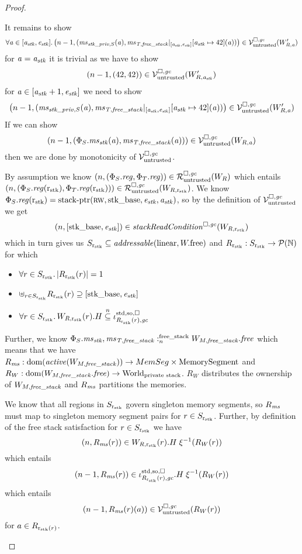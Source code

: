 \begin{proof}
\begin{itemize}
    It remains to show
    \[
      \forall \aaddr \in [\aaddr_\stk,\eaddr_\stk] \ldotp \npair[n-1]{(\ms_{\stk\_\priv,S}(\aaddr),\ms_\var{T,free\_stack}|_{[\aaddr_\stk,\eaddr_\stk]}\update{\aaddr_\stk}{42}(\aaddr))} \in \lrv(W_{R,\aaddr}')
    \]
    for $\aaddr = \aaddr_\stk$ it is trivial as we have to show
    \[
      \npair[n-1]{(42,42)} \in \lrv(W_{R,\aaddr_\stk}')
    \]
    for $\aaddr \in [\aaddr_\stk+1,\eaddr_\stk]$ we need to show
    \[
      \npair[n-1]{(\ms_{\stk\_\priv,S}(\aaddr),\ms_\var{T,free\_stack}|_{[\aaddr_\stk,\eaddr_\stk]}\update{\aaddr_\stk}{42}(\aaddr))} \in \lrv(W_{R,\aaddr}')
    \]
    If we can show
    \[
      \npair[n-1]{(\Phi_S.\ms_\stk(\aaddr),\ms_\var{T,free\_stack}(\aaddr))} \in \lrv(W_{R,\aaddr})
    \]
    then we are done by monotonicity of $\lrv$.

    By assumption we know $\npair{(\Phi_S.\reg,\Phi_T.\reg)} \in \lrr(W_R)$ which entails $\npair{(\Phi_S.\reg(\rstk),\Phi_T.\reg(\rstk))} \in \lrr(W_{R,\rstk})$.
    We know $\Phi_S.\reg(\rstk) = \stkptr{\rw,\stkb,\eaddr_\stk,\aaddr_\stk}$, so by the definition of $\lrv$ we get
    \[
      \npair{[\stkb,\eaddr_\stk]} \in \stackReadCond{W_{R,\rstk}}
    \]
    which in turn gives us $S_{\rstk} \subseteq \addressable{\linear,\pwfree}$ and
    $R_{\rstk} : S_{\rstk} \fun \powerset{\nats}$ for which
    \begin{itemize}
    \item $\forall r \in S_{\rstk} \ldotp |R_{\rstk}(r)| = 1$
    \item $\uplus_{r \in S_{\rstk}} R_{\rstk}(r) \supseteq [\stkb,\eaddr_\stk]$
    \item $\forall r \in S_{\rstk} \ldotp W_{R,\rstk}(r).H \nsubeq \stdreg{R_{\rstk}(r),\gc}{\spao}$
    \end{itemize}
    Further, we know $\memSatFStack{\Phi_S.\ms_\stk,\ms_\var{T,free\_stack}}{W_{M,\var{free\_stack}}.\free}$ which means that we have $R_\ms : \dom(\activeReg{W_{M,\var{free\_stack}}}) \fun MemSeg \times \MemSeg$ and $R_W : \dom(W_{M,\var{free\_stack}}.\free) \fun \Worlds$.
    $R_W$ distributes the ownership of $W_{M,\var{free\_stack}}$ and $R_\ms$ partitions the memories.

    We know that all regions in $S_{\rstk}$ govern singleton memory segments, so $R_\ms$ must map to singleton memory segment pairs for $r \in S_{\rstk}$.
    Further, by definition of the free stack satisfaction for $r \in S_{\rstk}$ we have
    \[
      \npair{R_\ms(r)} \in W_{R,\rstk}(r).H \; \xi^{-1}(R_W(r))
    \]
    which entails
    \[
      \npair[n-1]{R_\ms(r)} \in \stdreg{R_{\rstk}(r),\gc}{\spao}.H \; \xi^{-1}(R_W(r))
    \]
    which entails
    \[
      \npair[n-1]{R_\ms(r)(a)} \in \lrv (R_W(r))
    \]
    for $a \in R_{\rstk(r)}$.


\end{itemize}
\end{proof}
